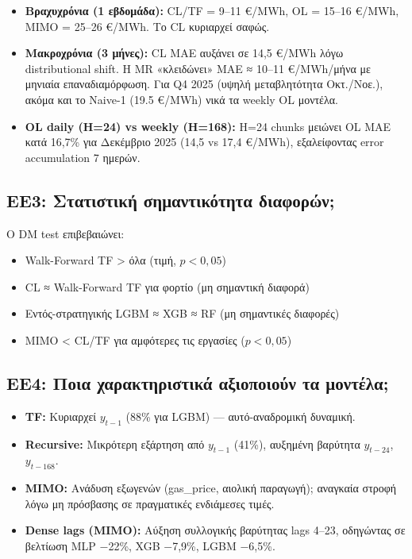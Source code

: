 \begin{itemize}
    \item \textbf{Βραχυχρόνια (1 εβδομάδα):} CL/TF = 9--11 €/MWh,
    OL = 15--16 €/MWh, MIMO = 25--26 €/MWh. Το CL κυριαρχεί σαφώς.
    \item \textbf{Μακροχρόνια (3 μήνες):} CL MAE αυξάνει σε 14,5 €/MWh
    λόγω distributional shift. Η MR «κλειδώνει» MAE ≈ 10--11 €/MWh/μήνα
    με μηνιαία επαναδιαμόρφωση. Για Q4 2025 (υψηλή μεταβλητότητα Οκτ./Νοε.),
    ακόμα και το Naive-1 (19.5 €/MWh) νικά τα weekly OL μοντέλα.
    \item \textbf{OL daily (H=24) vs weekly (H=168):} H=24 chunks μειώνει
    OL MAE κατά 16,7\% για Δεκέμβριο 2025 (14,5 vs 17,4 €/MWh), εξαλείφοντας
    error accumulation 7 ημερών.
\end{itemize}

\subsection*{ΕΕ3: Στατιστική σημαντικότητα διαφορών;}

Ο DM test επιβεβαιώνει:
\begin{itemize}
    \item Walk-Forward TF > όλα (τιμή, $p<0{,}05$)
    \item CL ≈ Walk-Forward TF για φορτίο (μη σημαντική διαφορά)
    \item Εντός-στρατηγικής LGBM ≈ XGB ≈ RF (μη σημαντικές διαφορές)
    \item MIMO < CL/TF για αμφότερες τις εργασίες ($p<0{,}05$)
\end{itemize}

\subsection*{ΕΕ4: Ποια χαρακτηριστικά αξιοποιούν τα μοντέλα;}

\begin{itemize}
    \item \textbf{TF:} Κυριαρχεί $y_{t-1}$ (88\% για LGBM) — αυτό-αναδρομική δυναμική.
    \item \textbf{Recursive:} Μικρότερη εξάρτηση από $y_{t-1}$ (41\%),
    αυξημένη βαρύτητα $y_{t-24}$, $y_{t-168}$.
    \item \textbf{MIMO:} Ανάδυση εξωγενών (gas\_price, αιολική παραγωγή);
    αναγκαία στροφή λόγω μη πρόσβασης σε πραγματικές ενδιάμεσες τιμές.
    \item \textbf{Dense lags (MIMO):} Αύξηση συλλογικής βαρύτητας lags 4--23,
    οδηγώντας σε βελτίωση MLP −22\%, XGB −7,9\%, LGBM −6,5\%.
\end{itemize}

